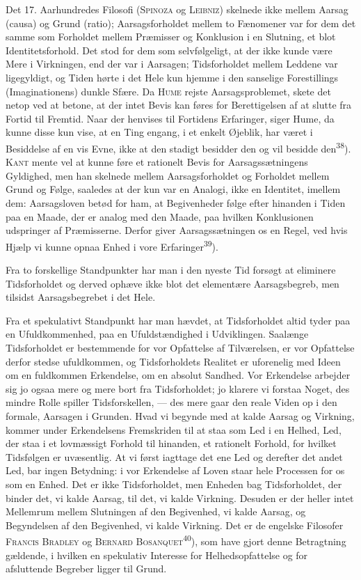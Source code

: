 \documentclass[12pt,a4paper,openany]{book}
\newcommand{\opage}[1]{\marginnote{\footnotesize\textit{[#1]}}}
\begin{document}
Det 17. Aarhundredes Filosofi (\textsc{Spinoza} og \textsc{Leibniz}) skelnede
ikke mellem Aarsag (causa) og Grund (ratio); Aarsagsforholdet mellem to
Fænomener var for dem det samme som Forholdet mellem Præmisser og Konklusion i
en Slutning, et blot Identitetsforhold. Det stod for dem som selvfølgeligt, at
der ikke kunde være Mere i Virkningen, end der var i Aarsagen; Tidsforholdet
mellem Leddene var ligegyldigt, og Tiden hørte i det Hele kun hjemme i den
sanselige Forestillings (Imaginationens) dunkle Sfære. Da \textsc{Hume} rejste
Aarsagsproblemet, skete det netop ved at betone, at der intet Bevis kan føres
for Berettigelsen af at slutte fra Fortid til Fremtid. Naar der henvises til
Fortidens Erfaringer, siger Hume, da kunne disse kun vise, at en Ting engang, i
et enkelt Øjeblik, har været i Besiddelse af en vis Evne, ikke at den stadigt
besidder den og vil besidde den\textsuperscript{38}). \textsc{Kant} mente vel
at kunne føre et rationelt Bevis for
\opage{44}Aarsagssætningens Gyldighed, men han skelnede mellem Aarsagsforholdet
og Forholdet mellem Grund og Følge, saaledes at der kun var en Analogi, ikke en
Identitet, imellem dem: Aarsagsloven betød for ham, at Begivenheder følge efter
hinanden i Tiden paa en Maade, der er analog med den Maade, paa hvilken
Konklusionen udspringer af Præmisserne. Derfor giver Aarsagssætningen os en
Regel, ved hvis Hjælp vi kunne opnaa Enhed i vore Erfaringer\textsuperscript{39}).

Fra to forskellige Standpunkter har man i den nyeste Tid forsøgt at eliminere
Tidsforholdet og derved ophæve ikke blot det elementære Aarsagsbegreb, men
tilsidst Aarsagsbegrebet i det Hele.

Fra et spekulativt Standpunkt har man hævdet, at Tidsforholdet altid tyder paa
en Ufuldkommenhed, paa en Ufuldstændighed i Udviklingen. Saalænge Tidsforholdet
er bestemmende for vor Opfattelse af Tilværelsen, er vor Opfattelse derfor
stedse ufuldkommen, og Tidsforholdets Realitet er uforenelig med Ideen om en
fuldkommen Erkendelse, om en absolut Sandhed. Vor Erkendelse arbejder sig jo
ogsaa mere og mere bort fra Tidsforholdet; jo klarere vi forstaa Noget, des
mindre Rolle spiller Tidsforskellen, --- des mere gaar den reale Viden op i den
formale, Aarsagen i Grunden. Hvad vi begynde med at kalde Aarsag og Virkning,
kommer under Erkendelsens Fremskriden til at staa som Led i en Helhed, Led, der
staa i et lovmæssigt Forhold til hinanden, et rationelt Forhold, for hvilket
Tidsfølgen er uvæsentlig. At vi først iagttage det ene Led og derefter det
andet Led, bar ingen Betydning: i vor Erkendelse af Loven staar hele Processen
for os som en Enhed. Det er ikke Tidsforholdet, men Enheden bag Tidsforholdet,
der binder det, vi kalde Aarsag, til det, vi kalde Virkning. Desuden er der
heller intet Mellemrum mellem Slutningen af den Begivenhed, vi kalde Aarsag, og
Begyndelsen af den Begivenhed, vi kalde Virkning. Det er de engelske Filosofer
\textsc{Francis Bradley} og \textsc{Bernard Bosanquet}\textsuperscript{40}),
som have gjort denne Betragtning gældende, i hvilken en spekulativ Interesse
for Helhedsopfattelse og for afsluttende Begreber ligger til Grund.
\end{document}
